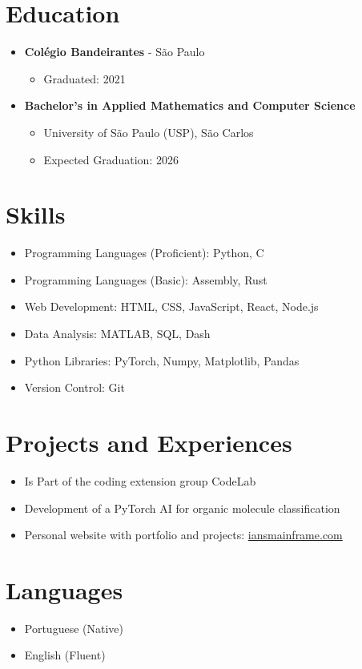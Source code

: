 \documentclass[a4paper,11pt]{article}
\begin{document}
\section*{Education}
\vspace{-0.3em}
\begin{itemize}[leftmargin=*, itemsep=-2pt]
  \item \textbf{Colégio Bandeirantes} - São Paulo
    \begin{itemize}[itemsep=-1pt]
      \item Graduated: 2021
    \end{itemize}
  \item \textbf{Bachelor's in Applied Mathematics and Computer Science}
    \begin{itemize}[itemsep=-1pt]
      \item University of São Paulo (USP), São Carlos
      \item Expected Graduation: 2026
    \end{itemize}
\end{itemize}
\vspace{-0.3em}

\section*{Skills}
\vspace{-0.3em}
\begin{itemize}[leftmargin=*, itemsep=-2pt]
  \item Programming Languages (Proficient): Python, C
  \item Programming Languages (Basic): Assembly, Rust
  \item Web Development: HTML, CSS, JavaScript, React, Node.js
  \item Data Analysis: MATLAB, SQL, Dash
  \item Python Libraries: PyTorch, Numpy, Matplotlib, Pandas
  \item Version Control: Git
\end{itemize}
\vspace{-0.3em}

\section*{Projects and Experiences}
\vspace{-0.3em}
\begin{itemize}[leftmargin=*, itemsep=-2pt]
  \item Is Part of the coding extension group CodeLab
  \item Development of a PyTorch AI for organic molecule classification
  \item Personal website with portfolio and projects: \href{https://iansmainframe.com}{iansmainframe.com}
\end{itemize}
\vspace{-0.3em}

\section*{Languages}
\vspace{-0.3em}
\begin{itemize}[leftmargin=*, itemsep=-2pt]
  \item Portuguese (Native)
  \item English (Fluent)
\end{itemize}
\end{document}
